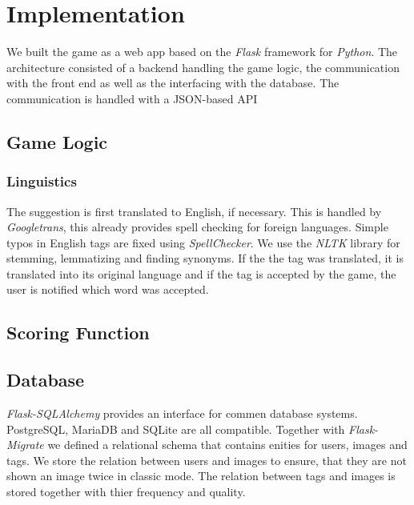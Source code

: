 \section{Implementation}
\label{gXLII:sec:implementation}  %


We built the game as a web app based on the \textit{Flask} framework for \textit{Python}. The architecture consisted of a backend handling the game logic, the communication with the front end as well as the interfacing with the database. The communication is handled with a JSON-based API

\subsection{Game Logic}
\label{gXLII:sec:implementation:game}  %



\subsubsection{Linguistics}
The suggestion is first translated to English, if necessary. This is handled by \textit{Googletrans}, this already provides spell checking for foreign languages.
Simple typos in English tags are fixed using \textit{SpellChecker}. We use the \textit{NLTK} library for stemming, lemmatizing and finding synonyms. If the the tag was translated, it is translated into its original language and if the tag is accepted by the game, the user is notified which word was accepted.

\subsection{Scoring Function}

\subsection{Database}
\label{gXLII:sec:implementation:database}  %
\textit{Flask-SQLAlchemy} provides an interface for commen database systems. PostgreSQL, MariaDB and SQLite are all compatible.
Together with \textit{Flask-Migrate} we defined a relational schema that contains enities for users, images and tags. We store the relation between users and images to ensure, that they are not shown an image twice in classic mode. The relation between tags and images is stored together with thier frequency and quality.


